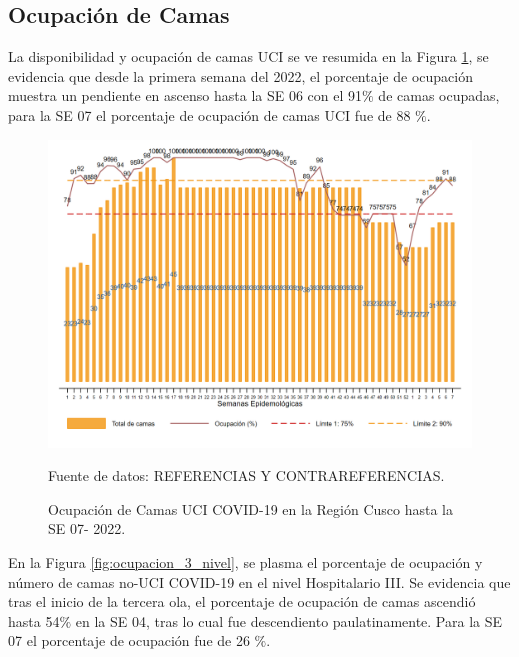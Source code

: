 \documentclass[12pt,a4paper,openany]{book}
\begin{document}
\clearpage
\subsection*{Ocupación de Camas}
\noindent La disponibilidad y ocupación de camas UCI se ve resumida en la Figura \ref{fig:ocupacion_uci}, se evidencia que desde la primera semana del 2022, el porcentaje de ocupación muestra un pendiente en ascenso hasta la SE 06 con el 91$\%$ de camas ocupadas, para la SE 07 el porcentaje de ocupación de camas UCI fue de 88 $\%$. 

\begin{figure}[h]
	\caption{Ocupación de Camas UCI COVID-19 en la Región Cusco hasta la SE 07- 2022.}\label{fig:ocupacion_uci}
	\begin{center}
		\includegraphics[width=0.95\linewidth]{../figuras/uci.png}
	\end{center}
	{\footnotesize {Fuente de datos: REFERENCIAS Y CONTRAREFERENCIAS.}}
\end{figure}
\cleardoublepage

En la Figura \ref{fig:ocupacion_3_nivel}, se plasma el porcentaje de ocupación y número de camas no-UCI COVID-19 en el nivel Hospitalario III. Se evidencia que tras el inicio de la tercera ola, el porcentaje de ocupación de camas ascendió hasta 54$\%$ en la SE 04, tras lo cual fue descendiento paulatinamente. Para la SE 07 el porcentaje de ocupación fue de 26 $\%$.    
  
\end{document}
